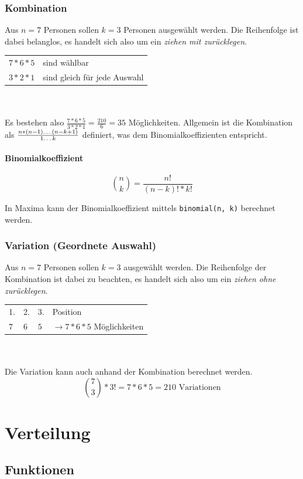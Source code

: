\documentclass{school}
\begin{document}
\subsubsection{Kombination}
Aus $n=7$ Personen sollen $k=3$ Personen ausgewählt werden. Die Reihenfolge ist dabei belanglos, es handelt sich also um ein \textit{ziehen mit zurücklegen}.

{\small \begin{tabular}{l l}
$7 * 6 * 5$ & sind wählbar\\
$3 * 2 * 1$ & sind gleich für jede Auswahl
\end{tabular}}
\\\\
Es bestehen also $\frac{7 * 6 * 5}{3 * 2 * 1} = \frac{210}{6} = 35$ Möglichkeiten.
Allgemein ist die Kombination als $\frac{n * (n-1) \text{\dots} (n - k + 1)}{1 \text{\dots} k}$ definiert, was dem Binomialkoeffizienten entspricht.

\paragraph{Binomialkoeffizient}
$$\binom{n}{k} = \frac{n!}{(n-k)! * k!}$$

In Maxima kann der Binomialkoeffizient mittels \verb|binomial(n, k)| berechnet werden.

\subsubsection{Variation \normalsize{(Geordnete Auswahl)}}
Aus $n=7$ Personen sollen $k=3$ ausgewählt werden. Die Reihenfolge der Kombination ist dabei zu beachten, es handelt sich also um ein \textit{ziehen ohne zurücklegen}.

{\small \begin{tabular}{l l l l}
1. & 2. & 3. & Position\\
$7$ & $6$ & $5$ & $\rightarrow 7 * 6 * 5$ Möglichkeiten
\end{tabular}}
\\\\
Die Variation kann auch anhand der Kombination berechnet werden.
$$\binom{7}{3} * 3! = 7 * 6 * 5 = 210 \text{~Variationen}$$

\newpage
\section{Verteilung}
\subsection{Funktionen}
\end{document}
